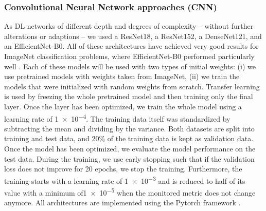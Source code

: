 \documentclass[11pt, authoryear]{elsarticle}
\begin{document}
	\subsubsection{Convolutional Neural Network approaches (CNN)}
	\label{sec:CNNmodel}
	As \gls{DL} networks of different depth and degrees of complexity -- without 
	further alterations or adaptions -- we used a ResNet18, a ResNet152, a 
	DenseNet121, and an EfficientNet-B0. All of these architectures have achieved 
	very good results for ImageNet \citep{deng2009imagenet} classification problems,
	where EfficientNet-B0 performed particularly well \citep{tan2019efficientnet}. 
	Each of these models will be used with two types of initial weights: (i) we use
	pretrained models with weights taken from ImageNet, (ii) we train the models that
	were initialized with random weights from scratch. 
	Transfer learning is used by freezing the whole pretrained model and then
	training only the final layer. Once the layer has been optimized, we train 
	the whole model using a learning rate of \SI{1e-4}{}. The training data
	itself was standardized by subtracting the mean and dividing by the variance. 
	Both datasets are split into training and test data, and 20\% of the training 
	data is kept as validation data. Once the model has been optimized, we evaluate 
	the model performance on the test data. 
	During the training, we use early stopping such that if the validation loss 
	does not improve for 20 epochs, we stop the training. Furthermore, the training
        starts with a learning rate of \SI{1e-3}{} and is reduced to half of its value 
        with a minimum of\SI{1e-5}{} when the monitored metric does not change anymore. 
        All architectures are implemented using	the Pytorch framework \citep{NEURIPS2019_9015}.
	
	
	
\end{document}
